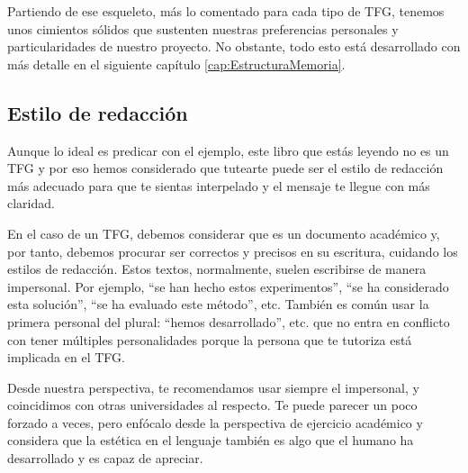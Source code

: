 Partiendo de ese esqueleto, más lo comentado para cada tipo de TFG, tenemos unos cimientos sólidos que sustenten nuestras preferencias personales y particularidades de nuestro proyecto. No obstante, todo esto está desarrollado con más detalle en el siguiente capítulo \ref{cap:EstructuraMemoria}.

\subsection{Estilo de redacción} %



Aunque lo ideal es predicar con el ejemplo, este libro que estás leyendo no es un TFG y por eso hemos considerado que tutearte puede ser el estilo de redacción más adecuado para que te sientas interpelado y el mensaje te llegue con más claridad. 

En el caso de un TFG, debemos considerar que es un documento académico y, por tanto, debemos procurar ser correctos y precisos en su escritura, cuidando los estilos de redacción. Estos textos, normalmente, suelen escribirse de manera impersonal. Por ejemplo, ``se han hecho estos experimentos'', ``se ha considerado esta solución'', ``se ha evaluado este método'', etc. También es común usar la primera personal del plural: ``hemos desarrollado'', etc. que no entra en conflicto con tener múltiples personalidades porque la persona que te tutoriza está implicada en el TFG. 

Desde nuestra perspectiva, te recomendamos usar siempre el impersonal, y coincidimos con otras universidades al respecto. Te puede parecer un poco forzado a veces, pero enfócalo desde la perspectiva de ejercicio académico y considera que la estética en el lenguaje también es algo que el humano ha desarrollado y es capaz de apreciar.

